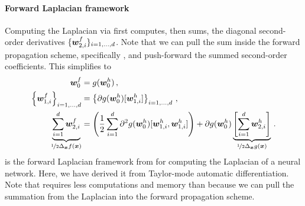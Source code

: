 \paragraph{Forward Laplacian framework}
Computing the Laplacian via  first computes, then sums, the diagonal second-order derivatives $\{ {\bm{w}}_{2,i}^f \}_{i=1,\dots, d}$.
Note that we can pull the sum inside the forward propagation scheme, specifically , and push-forward the summed second-order coefficients. This simplifies  to
\begin{subequations}\label{eq:forward-laplacian}
  \begin{align}
    {\bm{w}}_0^f
    &=
      g({\bm{w}}_0^h)\,,
    \\
    \left\{
    {\bm{w}}_{1,i}^f
    \right\}_{i=1, \dots, d}
    &=
      \left\{
      \partial g({\bm{w}}_0^h)[{\bm{w}}_{1,i}^h]
      \right\}_{i=1, \dots, d}\,,
    \\
    \underbrace{
    \sum_{i=1}^d
    {\bm{w}}_{2,i}^f
    }_{\nicefrac{1}{2}\Delta_{{\bm{x}}} f({\bm{x}})}
    &=
      \left(
      \frac{1}{2}
      \sum_{i=1}^d
      \partial^2 g({\bm{w}}_0^h)[{\bm{w}}_{1,i}^h, {\bm{w}}_{1,i}^h]
      \right)
      +
      \partial g({\bm{w}}_0^h)
      \underbrace{
      \left[
      \sum_{i=1}^d {\bm{w}}_{2,i}^h
      \right]
      }_{\nicefrac{1}{2}\Delta_{{\bm{x}}} g({\bm{x}})}\,.
  \end{align}
\end{subequations}
 is the forward Laplacian framework from \citet{li2023forward} for computing the Laplacian of a neural network.
Here, we have derived it from Taylor-mode automatic differentiation.
Note that  requires less computations and memory than  because we can pull the summation from the Laplacian into the forward propagation scheme.

